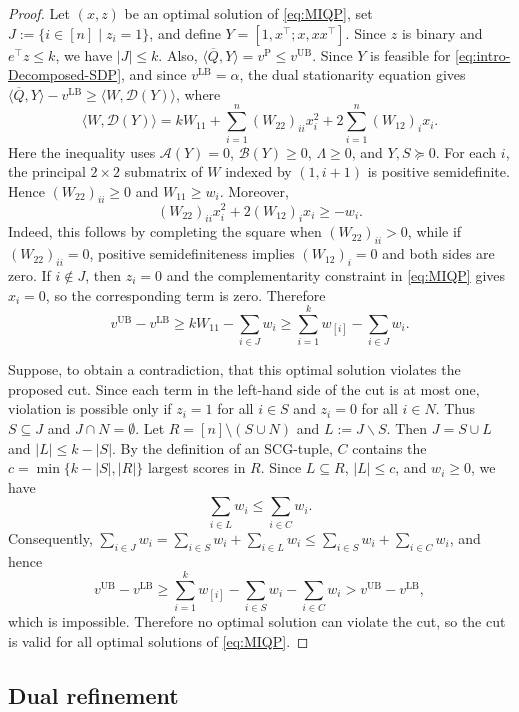 \documentclass[11pt]{article}
\def\D{\mathcal{D}}
\def\A{\mathcal{A}}
\def\B{\mathcal{B}}
\def\bQ{\overline{Q}}
\theoremstyle{plain}
\begin{document}
\begin{proof}\;
Let $(x,z)$ be an optimal solution of \eqref{eq:MIQP}, set $J:=\{i\in[n]\mid z_i=1\}$, and define $Y=[1,x^\top;x,xx^\top]$. Since $z$ is binary and $e^\top z\le k$, we have $|J|\le k$. Also, $\langle \bQ,Y\rangle=v^{\mathrm{P}}\le v^{\mathrm{UB}}$. Since $Y$ is feasible for \eqref{eq:intro-Decomposed-SDP}, and since $v^{\mathrm{LB}}=\alpha$, the dual stationarity equation gives $\langle\bQ,Y\rangle-v^{\mathrm{LB}}\ge\langle W,\D(Y)\rangle$, where
\[
\langle W,\D(Y)\rangle
=kW_{11}+\sum_{i=1}^n (W_{22})_{ii}x_i^2+2\sum_{i=1}^n (W_{12})_i x_i .
\]
Here the inequality uses $\A(Y)=0$, $\B(Y)\ge0$, $\Lambda\ge0$, and $Y,S\succeq0$.
For each $i$, the principal $2\times2$ submatrix of $W$ indexed by $(1,i+1)$ is positive semidefinite. Hence $(W_{22})_{ii}\ge0$ and $W_{11}\ge w_i$. Moreover,
\[
(W_{22})_{ii}x_i^2+2(W_{12})_i x_i\ge -w_i .
\]
Indeed, this follows by completing the square when $(W_{22})_{ii}>0$, while if $(W_{22})_{ii}=0$, positive semidefiniteness implies $(W_{12})_i=0$ and both sides are zero. If $i\notin J$, then $z_i=0$ and the complementarity constraint in \eqref{eq:MIQP} gives $x_i=0$, so the corresponding term is zero. Therefore
\[
v^{\mathrm{UB}}-v^{\mathrm{LB}}
\ge
kW_{11}-\sum_{i\in J}w_i
\ge
\sum_{i=1}^k w_{[i]}-\sum_{i\in J}w_i .
\]

Suppose, to obtain a contradiction, that this optimal solution violates the proposed cut. Since each term in the left-hand side of the cut is at most one, violation is possible only if $z_i=1$ for all $i\in S$ and $z_i=0$ for all $i\in N$. Thus $S\subseteq J$ and $J\cap N=\emptyset$. Let $R=[n]\setminus(S\cup N)$ and $L:=J\backslash S$. Then $J=S\cup L$ and $|L|\le k-|S|$. By the definition of an SCG-tuple, $C$ contains the $c=\min\{k-|S|,|R|\}$ largest scores in $R$. Since $L\subseteq R$, $|L|\le c$, and $w_i\ge0$, we have
\[
\sum_{i\in L}w_i\le \sum_{i\in C}w_i .
\]
Consequently, $\sum_{i\in J}w_i=\sum_{i\in S}w_i+\sum_{i\in L}w_i\le \sum_{i\in S}w_i+\sum_{i\in C}w_i$, and hence
\[
v^{\mathrm{UB}}-v^{\mathrm{LB}}
\ge
\sum_{i=1}^k w_{[i]}-\sum_{i\in S}w_i-\sum_{i\in C}w_i
>
v^{\mathrm{UB}}-v^{\mathrm{LB}},
\]
which is impossible. Therefore no optimal solution can violate the cut, so the cut is valid for all optimal solutions of \eqref{eq:MIQP}.
\end{proof}





\subsection{Dual refinement}\label{subsec:dual-refinement}
\end{document}
